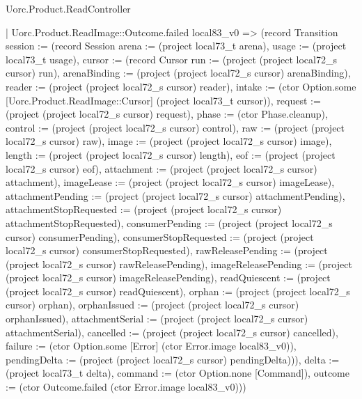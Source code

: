 \begin{lexlean}{Uorc.Product.ReadController}
\begin{semanticmodule}
{    | Uorc.Product.ReadImage::Outcome.failed local83_v0 => (record Transition {session := (record Session {arena := (project local73_t arena), usage := (project local73_t usage), cursor := (record Cursor {run := (project (project local72_s cursor) run), arenaBinding := (project (project local72_s cursor) arenaBinding), reader := (project (project local72_s cursor) reader), intake := (ctor Option.some [Uorc.Product.ReadImage::Cursor] (project local73_t cursor)), request := (project (project local72_s cursor) request), phase := (ctor Phase.cleanup), control := (project (project local72_s cursor) control), raw := (project (project local72_s cursor) raw), image := (project (project local72_s cursor) image), length := (project (project local72_s cursor) length), eof := (project (project local72_s cursor) eof), attachment := (project (project local72_s cursor) attachment), imageLease := (project (project local72_s cursor) imageLease), attachmentPending := (project (project local72_s cursor) attachmentPending), attachmentStopRequested := (project (project local72_s cursor) attachmentStopRequested), consumerPending := (project (project local72_s cursor) consumerPending), consumerStopRequested := (project (project local72_s cursor) consumerStopRequested), rawReleasePending := (project (project local72_s cursor) rawReleasePending), imageReleasePending := (project (project local72_s cursor) imageReleasePending), readQuiescent := (project (project local72_s cursor) readQuiescent), orphan := (project (project local72_s cursor) orphan), orphanIssued := (project (project local72_s cursor) orphanIssued), attachmentSerial := (project (project local72_s cursor) attachmentSerial), cancelled := (project (project local72_s cursor) cancelled), failure := (ctor Option.some [Error] (ctor Error.image local83_v0)), pendingDelta := (project (project local72_s cursor) pendingDelta)})}), delta := (project local73_t delta), command := (ctor Option.none [Command]), outcome := (ctor Outcome.failed (ctor Error.image local83_v0))})
}
\end{semanticmodule}
\end{lexlean}
